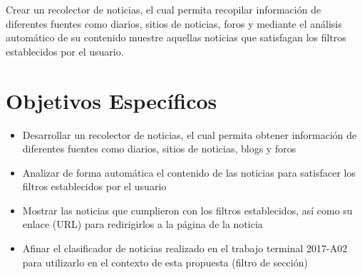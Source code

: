   Crear un recolector de noticias, el cual permita recopilar información de diferentes fuentes como diarios, sitios de noticias, foros y mediante el 
  análisis automático de su contenido muestre aquellas noticias que satisfagan los filtros establecidos por el usuario.
  

\section{Objetivos Específicos}
\begin{itemize}
  \item Desarrollar un recolector de noticias, el cual permita obtener información de diferentes fuentes como diarios, sitios de noticias, blogs y foros
  \item Analizar de forma automática el contenido de las noticias para satisfacer los filtros establecidos por el usuario
  \item Mostrar las noticias que cumplieron con los filtros establecidos, así como su enlace (URL) para redirigirlos a la página de la noticia
  \item Afinar el clasificador de noticias realizado en el trabajo terminal 2017-A02 para utilizarlo en el contexto de esta propuesta (filtro de sección) 
\end{itemize}